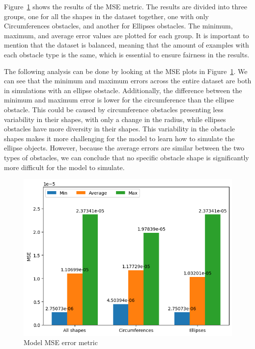 Figure~\ref{fig:ErrorMeasurements} shows the results of the MSE metric. The results are divided into three groups, one for all the shapes in the dataset together, one with only Circumferences obstacles, and another for Ellipses obstacles. The minimum, maximum, and average error values are plotted for each group. It is important to mention that the dataset is balanced, meaning that the amount of examples with each obstacle type is the same, which is essential to ensure fairness in the results. 

The following analysis can be done by looking at the MSE plots in Figure~\ref{fig:ErrorMeasurements}. We can see that the minimum and maximum errors across the entire dataset are both in simulations with an ellipse obstacle. Additionally, the difference between the minimum and maximum error is lower for the circumference than the ellipse obstacle. This could be caused by circumference obstacles presenting less variability in their shapes, with only a change in the radius, while ellipses obstacles have more diversity in their shapes. This variability in the obstacle shapes makes it more challenging for the model to learn how to simulate the ellipse objects. However, because the average errors are similar between the two types of obstacles, we can conclude that no specific obstacle shape is significantly more difficult for the model to simulate. 

\begin{figure}[!htbp]
    \centering
    \includegraphics[width=0.7\linewidth]{images/MSE.png}
    \caption{Model MSE error metric}
    \label{fig:ErrorMeasurements}
\end{figure}


